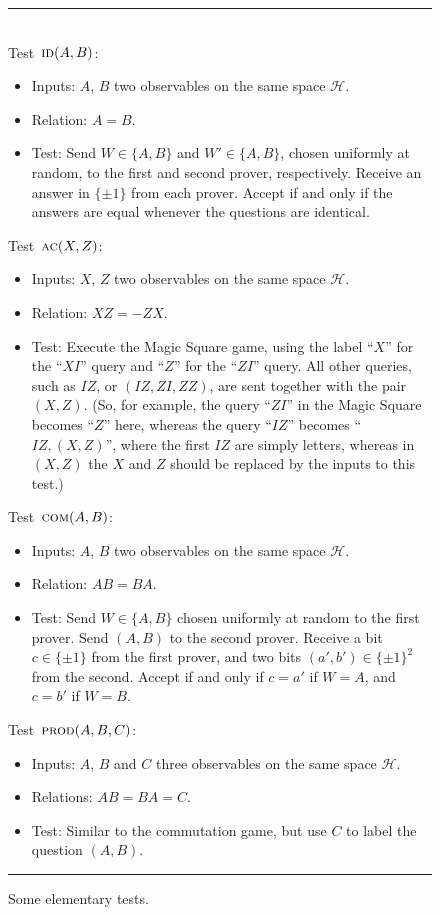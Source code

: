 \documentclass{toc}
\newcommand{\mH}{\mathcal{H}}
\newcommand{\prodt}{\textsc{prod}}
\newcommand{\comt}{\textsc{com}}
\newcommand{\act}{\textsc{ac}}
\newcommand{\idt}{\textsc{id}}
\begin{document}
\begin{figure}[H]
\rule[1ex]{\textwidth}{0.5pt}\\
\justifying
Test~$\idt(A,B)$:
\begin{itemize}
\setlength\itemsep{-0.25em}   %
    \item Inputs: $A$, $B$ two observables on the same space $\mH$.
    \item Relation: $A=B$.
    \item Test: Send $W \in \{A,B\}$ and $W'\in\{A,B\}$, chosen uniformly at random, to the first and second prover, %
 respectively. Receive an answer in $\{\pm 1\}$ from each prover. Accept if and only if the answers are equal whenever the questions are identical. 
\end{itemize}

Test~$\act(X,Z)$:
\begin{itemize}
\setlength\itemsep{-0.25em}   %
    \item Inputs: $X$, $Z$ two observables on the same space $\mH$.
    \item Relation: $XZ=-ZX$.
    \item Test: Execute the Magic Square game, using the label ``$X$'' for the ``$XI$'' query and ``$Z$'' for the ``$ZI$'' query. All other queries, such as $IZ$, or $(IZ,ZI,ZZ)$, are sent together with the pair $(X,Z)$. (So, for example, the query ``$ZI$'' in the Magic Square becomes ``$Z$'' here, whereas the query ``$IZ$'' becomes ``$IZ,(X,Z)$'', where the first $IZ$ are simply letters, whereas in $(X,Z)$ the $X$ and $Z$ should be replaced by the inputs to this test.)
\end{itemize}

Test~$\comt(A,B)$:
\begin{itemize}
\setlength\itemsep{-0.25em}   %
    \item Inputs: $A$, $B$ two observables on the same space $\mH$.
    \item Relation: $AB=BA$.
    \item Test: Send $W\in\{A,B\}$ chosen uniformly at random to the first prover. Send $(A,B)$ to the second prover. Receive a bit $c\in\{\pm 1\}$ from the first prover, and two bits $(a',b')\in\{\pm 1\}^2$ from the second. Accept if and only if $c=a'$ if $W=A$, and $c=b'$ if $W=B$. 
\end{itemize}

Test~$\prodt(A,B,C)$:
\begin{itemize}
\setlength\itemsep{-0.25em}   %
    \item Inputs: $A$, $B$ and $C$ three observables on the same space $\mH$.
    \item Relations: $AB=BA=C$.
    \item Test: Similar to the commutation game, but use $C$ to label the question $(A,B)$.
\end{itemize}
\rule[2ex]{\textwidth}{0.5pt}\vspace{-.5cm}
\caption{Some elementary tests.}
\label{fig:elementary}
\end{figure}
\end{document}
